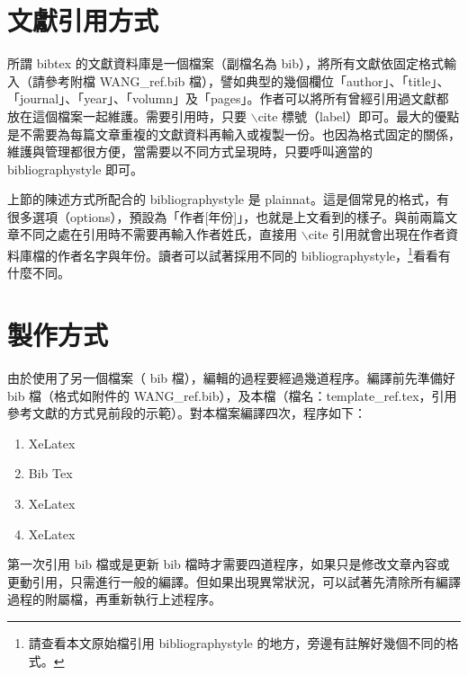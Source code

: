 \section{文獻引用方式}
所謂 bibtex 的文獻資料庫是一個檔案（副檔名為 bib），將所有文獻依固定格式輸入（請參考附檔 WANG\_ref.bib 檔），譬如典型的幾個欄位「author」、「title」、「journal」、「year」、「volumn」及「pages」。作者可以將所有曾經引用過文獻都放在這個檔案一起維護。需要引用時，只要 $\backslash$cite 標號（label）即可。最大的優點是不需要為每篇文章重複的文獻資料再輸入或複製一份。也因為格式固定的關係，維護與管理都很方便，當需要以不同方式呈現時，只要呼叫適當的 bibliographystyle 即可。

上節的陳述方式所配合的 bibliographystyle 是 {\BB plainnat}。這是個常見的格式，有很多選項（options），預設為「作者[年份]」，也就是上文看到的樣子。與前兩篇文章不同之處在引用時不需要再輸入作者姓氏，直接用 $\backslash$cite 引用就會出現在作者資料庫檔的作者名字與年份。讀者可以試著採用不同的 bibliographystyle，\footnote{請查看本文原始檔引用 bibliographystyle 的地方，旁邊有註解好幾個不同的格式。}看看有什麼不同。

\section{製作方式}
由於使用了另一個檔案（ bib 檔），編輯的過程要經過幾道程序。編譯前先準備好 bib 檔（格式如附件的  WANG\_ref.bib），及本檔（檔名：template\_ref.tex，引用參考文獻的方式見前段的示範）。對本檔案編譯四次，程序如下：

\begin{enumerate}
\item XeLatex
\item Bib Tex
\item XeLatex
\item XeLatex
\end{enumerate}


第一次引用 bib 檔或是更新 bib 檔時才需要四道程序，如果只是修改文章內容或更動引用，只需進行一般的編譯。但如果出現異常狀況，可以試著先清除所有編譯過程的附屬檔，再重新執行上述程序。

%
%
%
%
%
%


%

%

